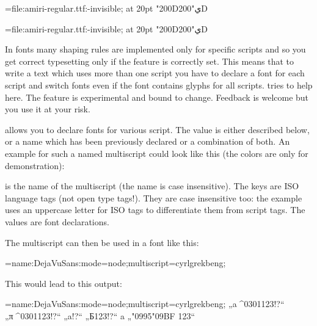     \beginlisting
         \font\amiri={file:amiri-regular.ttf:-invisible;} at 20pt \amiri
         \char"200Dي\char"200D
         \endlisting

       {\font\amiri={file:amiri-regular.ttf:-invisible;} at 20pt \amiri \char"200Dي\char"200D}


  \endaltitem

   In\label{multiscript} fonts many shaping rules are implemented only for specific scripts and so you get correct typesetting only if the  feature is correctly set. This means that to write a text which uses more than one script you have to declare a font for each script and switch fonts even if the font contains glyphs for all scripts.
    tries to help here. The feature is experimental and bound to change. Feedback is welcome but you use it at your risk.

    allows you to declare fonts for various script. The value is either  described below, or a name which has been previously declared or a combination of both. An example for such a named multiscript could look like this (the colors are only for demonstration):

   \beginlisting
   \endlisting

   is the name of the multiscript (the name is case insensitive). The keys are ISO language tags (not open type tags!).  They are case insensitive too: the example uses an uppercase letter for ISO tags to differentiate them from script tags.  The values are font declarations.

  The multiscript can then be used in a font like this:

  \beginlisting
   \font\test={name:DejaVuSans:mode=node;multiscript=cyrlgrekbeng;}
  \endlisting

  This would lead to this output:

  {\Large \font\test={name:DejaVuSans:mode=node;multiscript=cyrlgrekbeng;}\test
   „a^^^^0301123!?“  „π^^^^0301123!?“ „a!?“  „Б123!?“ a „\char"0995\char"09BF 123“
  }

